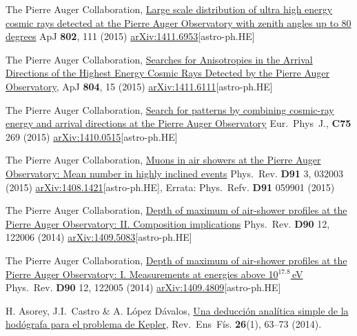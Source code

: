 \begin{etaremune}
\item {}The Pierre Auger Collaboration, \href{http://dx.doi.org/}{{Large scale distribution of ultra high energy cosmic rays detected at the Pierre Auger Observatory with zenith angles up to 80 degrees}} ApJ {\textbf{802}}, 111 (2015) \href{http://arxiv.org/abs/1411.6953}{arXiv:1411.6953}[astro-ph.HE]

\item {}The Pierre Auger Collaboration, \href{http://dx.doi.org/}{{Searches for Anisotropies in the Arrival Directions of the Highest Energy Cosmic Rays Detected by the Pierre Auger Observatory}}, ApJ {\textbf{804}}, 15 (2015) \href{http://arxiv.org/abs/1411.6111}{arXiv:1411.6111}[astro-ph.HE]

\item {}The Pierre Auger Collaboration, \href{http://dx.doi.org/}{{Search for patterns by combining cosmic-ray energy and arrival directions at the Pierre Auger Observatory}} Eur.\ Phys\  J., {\textbf{C75}} 269 (2015) \href{http://arxiv.org/abs/1410.0515}{arXiv:1410.0515}[astro-ph.HE]

\item {}The Pierre Auger Collaboration, \href{http://dx.doi.org/10.1103/PhysRevD.91.032003}{{Muons in air showers at the Pierre Auger Observatory: Mean number in highly inclined events}} Phys.\ Rev. {\textbf{D91}} 3, 032003 (2015) \href{http://arxiv.org/abs/1408.1421}{arXiv:1408.1421}[astro-ph.HE], Errata: Phys.\ Refv. {\textbf{D91}} 059901 (2015)

\item {}The Pierre Auger Collaboration, \href{http://dx.doi.org/10.1103/PhysRevD.90.122006}{{Depth of maximum of air-shower profiles at the Pierre Auger Observatory: II. Composition implications}} Phys.\ Rev. {\textbf{D90}} 12, 122006 (2014) \href{http://arxiv.org/abs/1409.5083}{arXiv:1409.5083}[astro-ph.HE]

\item {}The Pierre Auger Collaboration, \href{http://dx.doi.org/10.1103/PhysRevD.90.122005}{{Depth of maximum of air-shower profiles at the Pierre Auger Observatory: I. Measurements at energies above 10$^{17.8}$\,eV}} Phys.\ Rev. {\textbf{D90}} 12, 122005 (2014) \href{http://arxiv.org/abs/1409.4809}{arXiv:1409.4809}[astro-ph.HE]

\item {}H. Asorey, J.I.\ Castro \& A. López Dávalos, \href{http://www.revistas.unc.edu.ar/index.php/revistaEF/article/view/9512}{{Una deducción analítica simple de la hodógrafa para el problema de Kepler}}, Rev.\ Ens\  Fís. {\textbf{26}}(1), 63--73 (2014).


\end{etaremune}
